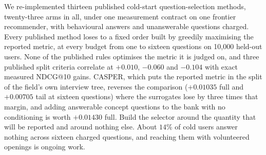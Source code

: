 \documentclass[runningheads]{llncs}
\begin{document}
We re-implemented thirteen published cold-start question-selection methods, twenty-three arms in
all, under one measurement contract on one frontier recommender, with behavioural answers and
unanswerable questions charged. Every published method loses to a fixed order built by greedily
maximising the reported metric, at every budget from one to sixteen questions on 10{,}000 held-out
users. None of the published rules optimises the metric it is judged on, and three published split
criteria correlate at $+0.010$, $-0.060$ and $-0.104$ with exact measured NDCG@10 gains. CASPER, which puts the reported metric in the split of the
field's own interview tree, reverses the comparison ($+0.01035$ full and $+0.00705$ tail at sixteen
questions) where the surrogates lose by three times that margin, and adding answerable concept questions to the bank with
no conditioning is worth $+0.01430$ full. Build the selector around the quantity that will be
reported and around nothing else. About $14\%$ of cold users answer nothing across sixteen charged
questions, and reaching them with volunteered openings is ongoing work.



\end{document}
